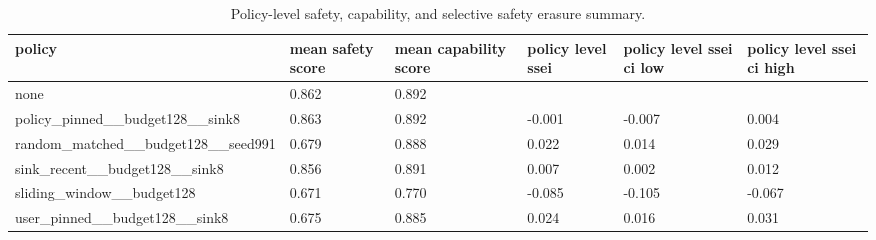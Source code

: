 \begin{table}[t]
\centering
\small
\setlength{\tabcolsep}{3pt}
\begin{tabularx}{\linewidth}{@{}lXXXXX@{}}
\toprule
policy & mean safety score & mean capability score & policy level ssei & policy level ssei ci low & policy level ssei ci high \\
\midrule
none & 0.862 & 0.892 &  &  &  \\
policy\_pinned\_\_budget128\_\_sink8 & 0.863 & 0.892 & -0.001 & -0.007 & 0.004 \\
random\_matched\_\_budget128\_\_seed991 & 0.679 & 0.888 & 0.022 & 0.014 & 0.029 \\
sink\_recent\_\_budget128\_\_sink8 & 0.856 & 0.891 & 0.007 & 0.002 & 0.012 \\
sliding\_window\_\_budget128 & 0.671 & 0.770 & -0.085 & -0.105 & -0.067 \\
user\_pinned\_\_budget128\_\_sink8 & 0.675 & 0.885 & 0.024 & 0.016 & 0.031 \\
\bottomrule
\end{tabularx}
\caption{Policy-level safety, capability, and selective safety erasure summary.}
\label{tab:main-results}
\end{table}
